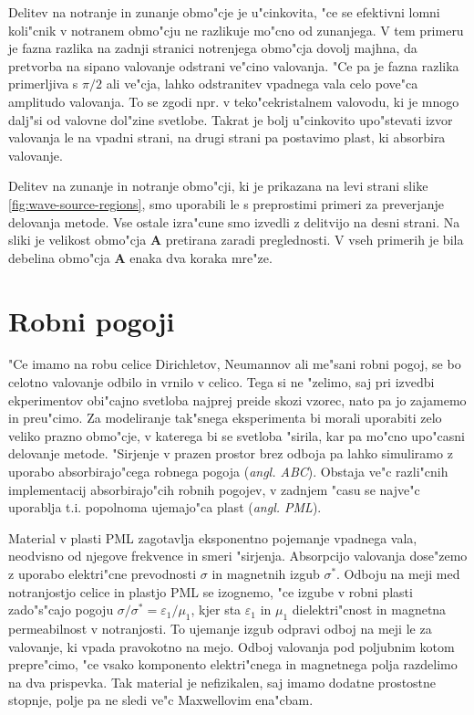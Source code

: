 \documentclass[12pt,twoside,openright,final]{report}
\newcommand{\eps}{\varepsilon}
\newcommand{\angl}[1]{(\textit{angl. #1})}
\begin{document}
Delitev na notranje in zunanje obmo"cje je u"cinkovita, "ce se efektivni lomni koli"cnik v notranem obmo"cju ne razlikuje mo"cno od zunanjega. 
V tem primeru je fazna razlika na zadnji stranici notrenjega obmo"cja dovolj majhna, da pretvorba na sipano valovanje odstrani ve"cino valovanja. 
"Ce pa je fazna razlika primerljiva s $\pi/2$ ali ve"cja, lahko odstranitev vpadnega vala celo pove"ca amplitudo valovanja. 
To se zgodi npr. v teko"cekristalnem valovodu, ki je mnogo dalj"si od valovne dol"zine svetlobe. 
Takrat je bolj u"cinkovito upo"stevati izvor valovanja le na vpadni strani, na drugi strani pa postavimo plast, ki absorbira valovanje. 

Delitev na zunanje in notranje obmo"cji, ki je prikazana na levi strani slike \ref{fig:wave-source-regions}, smo uporabili le s preprostimi primeri za preverjanje delovanja metode. 
Vse ostale izra"cune smo izvedli z delitvijo na desni strani. 
Na sliki je velikost obmo"cja \textbf{A} pretirana zaradi preglednosti. 
V vseh primerih je bila debelina obmo"cja \textbf{A} enaka dva koraka mre"ze. 

\section{Robni pogoji}

"Ce imamo na robu celice Dirichletov, Neumannov ali me"sani robni pogoj, se bo celotno valovanje odbilo in vrnilo v celico. 
Tega si ne "zelimo, saj pri izvedbi ekperimentov obi"cajno svetloba najprej preide skozi vzorec, nato pa jo zajamemo in preu"cimo. 
Za modeliranje tak"snega eksperimenta bi morali uporabiti zelo veliko prazno obmo"cje, v katerega bi se svetloba "sirila, kar pa mo"cno upo"casni delovanje metode. 
"Sirjenje v prazen prostor brez odboja pa lahko simuliramo z uporabo absorbirajo"cega robnega pogoja \angl{\ac{ABC}}. 
Obstaja ve"c razli"cnih implementacij absorbirajo"cih robnih pogojev, v zadnjem "casu se najve"c uporablja t.i. popolnoma ujemajo"ca plast \angl{\ac{PML}}\cite{taflove,berenger}. 

Material v plasti \acs{PML} zagotavlja eksponentno pojemanje vpadnega vala, neodvisno od njegove frekvence in smeri "sirjenja. 
Absorpcijo valovanja dose"zemo z uporabo elektri"cne prevodnosti $\sigma$ in magnetnih izgub $\sigma^*$. 
Odboju na meji med notranjostjo celice in plastjo \acs{PML} se izognemo, "ce izgube v robni plasti zado"s"cajo pogoju $\sigma/\sigma^* = \eps_1/\mu_1$, kjer sta $\eps_1$ in $\mu_1$ dielektri"cnost in magnetna permeabilnost v notranjosti. 
To ujemanje izgub odpravi odboj na meji le za valovanje, ki vpada pravokotno na mejo. 
Odboj valovanja pod poljubnim kotom prepre"cimo, "ce vsako komponento elektri"cnega in magnetnega polja razdelimo na dva prispevka. 
Tak material je nefizikalen, saj imamo dodatne prostostne stopnje, polje pa ne sledi ve"c Maxwellovim ena"cbam. 
\end{document}
